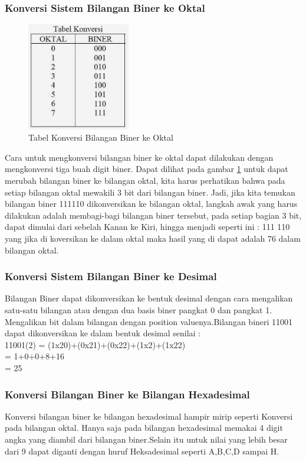 \subsubsection{Konversi Sistem Bilangan Biner ke Oktal}
\begin{figure}[ht]
\centerline{\includegraphics[width=0.4\textwidth]{figures/konversioktal.JPG}}
\caption{Tabel Konversi Bilangan Biner ke Oktal}
\label{konversioktal}
\end{figure}
\break
Cara untuk mengkonversi bilangan biner ke oktal dapat dilakukan dengan mengkonversi tiga buah digit biner. Dapat dilihat pada gambar \ref{konversioktal} untuk dapat merubah bilangan biner ke bilangan oktal, kita harus perhatikan bahwa pada setiap bilangan oktal mewakili 3 bit dari bilangan biner. Jadi, jika kita temukan bilangan biner 111110 dikonversikan ke bilangan oktal, langkah awak yang harus dilakukan adalah membagi-bagi bilangan biner tersebut, pada setiap bagian 3 bit, dapat dimulai dari sebelah Kanan ke Kiri, hingga menjadi seperti ini : 111 110 yang jika di koversikan ke dalam oktal maka hasil yang di dapat adalah 76 dalam bilangan oktal.

\subsubsection{Konversi Sistem Bilangan Biner ke Desimal}
Bilangan Biner dapat dikonversikan ke bentuk desimal dengan cara mengalikan satu-satu bilangan atau dengan dua basis biner pangkat 0 dan pangkat 1. Mengalikan bit dalam bilangan dengan position valuenya.Bilangan bineri 11001 dapat dikonversikan ke dalam bentuk desimal senilai : \\

11001(2) = (1x20)+(0x21)+(0x22)+(1x2)+(1x22) \\
= 1+0+0+8+16 \\
= 25

\subsubsection{Konversi Bilangan Biner ke Bilangan Hexadesimal}
Konversi bilangan biner ke bilangan hexadesimal hampir mirip seperti Konversi pada bilangan oktal. Hanya saja pada bilangan hexadesimal memakai 4 digit angka yang diambil dari bilangan biner.Selain itu untuk nilai yang lebih besar dari 9 dapat diganti dengan huruf Heksadesimal seperti A,B,C,D sampai H. 
